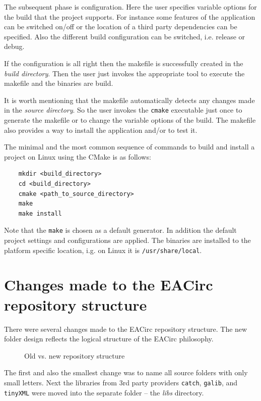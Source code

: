 \documentclass[12pt,oneside]{fithesis2}
\begin{document}
The subsequent phase is configuration. Here the user specifies variable options for the build that the project supports. For instance some features of the application can be switched on/off or the location of a third party dependencies can be specified. Also the different build configuration can be switched, i.e. release or debug.

If the configuration is all right then the makefile is successfully created in the \emph{build directory}. Then the user just invokes the appropriate tool to execute the makefile and the binaries are build.

It is worth mentioning that the makefile automatically detects any changes made in the \emph{source directory}. So the user invokes the \texttt{cmake} executable just once to generate the makefile or to change the variable options of the build. The makefile also provides a way to install the application and/or to test it.

The minimal and the most common sequence of commands to build and install a project on Linux using the CMake is as follows:
	\begin{verbatim}
	mkdir <build_directory>
	cd <build_directory>
	cmake <path_to_source_directory>
	make
	make install
	\end{verbatim}
Note that the \texttt{make} is chosen as a default generator. In addition the default project settings and configurations are applied. The binaries are installed to the platform specific location, i.g. on Linux it is \texttt{/usr/share/local}.

\section{Changes made to the EACirc repository structure}

There were several changes made to the EACirc repository structure. The new folder design reflects the logical structure of the EACirc philosophy.

	\begin{figure}[H]
	\centering
	
	\caption{Old vs. new repository structure}
	\end{figure}
	
\noindent
The first and also the smallest change was to name all source folders with only small letters. Next the libraries from 3rd party providers \texttt{catch}, \texttt{galib}, and \texttt{tinyXML} were moved into the separate folder -- the \emph{libs} directory.
\end{document}
